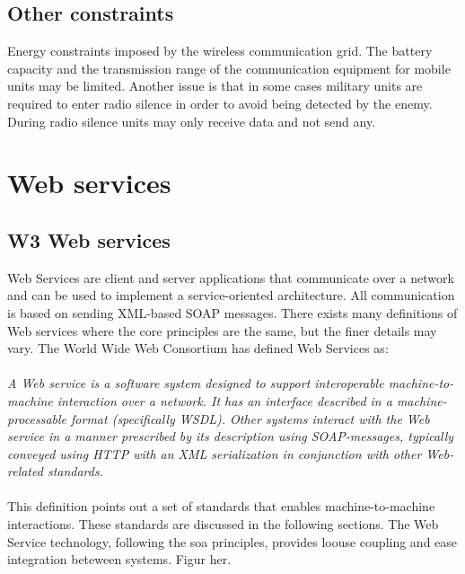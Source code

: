 \subsection{Other constraints}
Energy constraints imposed by the wireless communication grid. The battery
capacity and the transmission range of the communication equipment for mobile
units may be limited. Another issue is that in some cases military units are
required to enter radio silence in order to avoid being detected by the enemy.
During radio silence units may only receive data and not send any.


\section{Web services}

\subsection{W3 Web services}
\label{web-services}
Web Services are client and server applications that communicate over a network
and can be used to implement a service-oriented architecture. All communication
is based on sending XML-based SOAP messages. There exists many definitions of
Web services where the core principles are the same, but the finer details may
vary. The World Wide Web Consortium has defined Web Services
as\cite{wrc-web-service}:
\paragraph{}
\textit{
    A Web service is a software system designed to support interoperable
    machine-to-machine interaction over a network. It has an interface described in
    a machine-processable format (specifically WSDL). Other systems interact with
    the Web service in a manner prescribed by its description using SOAP-messages,
    typically conveyed using HTTP with an XML serialization in conjunction with
    other Web-related standards.
}

\paragraph{}

This definition points out a set of standards that enables machine-to-machine
interactions. These standards are discussed in the following sections. The Web
Service technology, following the \gls{soa} principles, provides loouse coupling
and ease integration beteween systems. Figur her.



